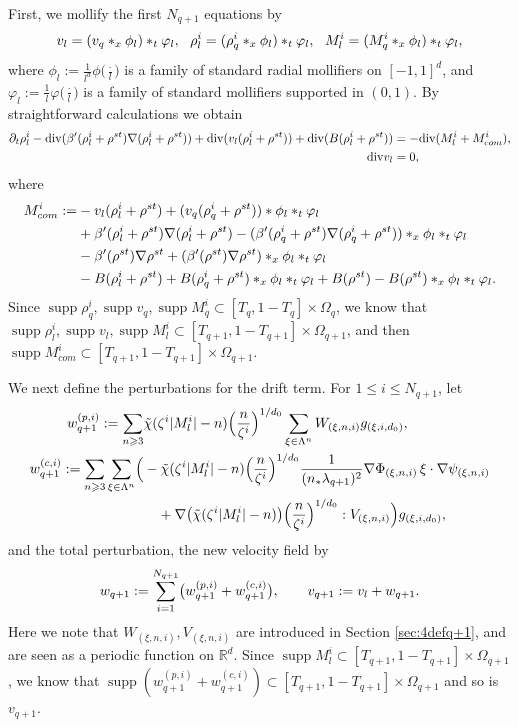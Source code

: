 \documentclass[UTF-8,reqno]{amsart}
\numberwithin{equation}{section}
\theoremstyle{definition}
\DeclareMathOperator{\supp}{supp}
\def\geq{\geqslant}
\def\leq{\leqslant}
\def\div{\mathord{{\rm div}}}
\def\geq{\geqslant}
\def\leq{\leqslant}
\def\div{\mathord{{\rm div}}}
\begin{document}
First,  we mollify the first $N_{q+1}$ equations by\begin{align}
v_l=(v_{q }*_x\phi_l)*_t\varphi_l,\ \ 
 \rho_l^i=(\rho_{q}^i*_x\phi_l)*_t\varphi_l,\ \ M_l^i=(M_{q }^i*_x\phi_l)*_t\varphi_l,\notag
\end{align}
where 
$
\phi_l:=\frac1{l^d}\phi\bigl(\tfrac{\cdot}{l}\bigr)
$
is a family of standard radial mollifiers on $[-1,1]^d$, and  
$
\varphi_l:=\frac1l\varphi\bigl(\tfrac{\cdot}{l}\bigr)
$
is a family of standard mollifiers supported in $(0,1)$. By straightforward calculations  we obtain 
\begin{align}
\partial_t \rho_l^i-\div(\beta'(\rho_l^i+\rho^{st})\nabla(\rho_l^i+\rho^{st}))+\div(v_l (\rho_l^i+\rho^{st}))+\div(B(\rho_l^i+\rho^{st}))&=-\div (M^i_l+M^i_{com}),\notag\\ \div v_l&=0,\notag
\end{align} where
\begin{align*}
M^i_{com} :=&-v_l   (\rho^i_l+\rho^{st})+(v_{q}   (\rho^i_{q}+\rho^{st}))* \phi_l*_t\varphi_l\\
&+\beta'(\rho^i _l+\rho^{st}) \nabla(\rho^i _l+\rho^{st})-(\beta'(\rho^i _q+\rho^{st}) \nabla(\rho^i _q+\rho^{st}))*_x\phi_l*_t\varphi_l\\
&-\beta'(\rho^{st}) \nabla\rho^{st}+(\beta'(\rho^{st}) \nabla\rho^{st})*_x\phi_l*_t\varphi_l\\
 &  -B(\rho_l^i+\rho^{st})+B(\rho_q^i+\rho^{st})*_x\phi_l*_t\varphi_l +B(\rho^{st})-B(\rho^{st})*_x\phi_l*_t\varphi_l.\notag
\end{align*} 
  Since $  \supp\rho_q^i,\supp v_q,\supp M_q^i\subset[T_q,1-T_q]\times \Omega_q $, we know that $  \supp\rho_l^i,\supp v_l,\supp M_l^i\subset [T_{q+1},1-T_{q+1}]\times \Omega_{q+1} $, and then $\supp M_{com}^i\subset [T_{q+1},1-T_{q+1}]\times\Omega_{q+1} $.
 


We next define the perturbations for the drift term. 
For $1\leq i\leq N_{q+1}$, let
\begin{align*}
w_{q+1}^{(p,i)}
:=
\sum_{n\geq3}
&\tilde{\chi}(\zeta^i|M_l^i|-n)
\Bigl(\frac{n}{\zeta^i}\Bigr)^{1/d_0}
\sum_{\xi\in\Lambda^n}
W_{(\xi,n,i)}g_{(\xi,i,d_0)},\\
w_{q+1}^{(c,i)}
:=
\sum_{n\geq3}
\sum_{\xi\in\Lambda^n}
\Bigl(
&
-\tilde{\chi}(\zeta^i|M_l^i|-n)
\Bigl(\frac{n}{\zeta^i}\Bigr)^{1/d_0}
\frac1{(n_*\lambda_{q+1})^2}
\nabla\Phi_{(\xi,n,i)}
\,\xi\cdot\nabla\psi_{(\xi,n,i)}
\\
&\quad
+
\nabla\bigl(
\tilde{\chi}(\zeta^i|M_l^i|-n)
\bigr)
\Bigl(\frac{n}{\zeta^i}\Bigr)^{1/d_0}
:V_{(\xi,n,i)}
\Bigr)
g_{(\xi,i,d_0)},
\end{align*}
and the total perturbation, the new velocity field by
\begin{align}
w_{q+1}
:=
\sum_{i=1}^{N_{q+1}}
\bigl(
w_{q+1}^{(p,i)}
+
w_{q+1}^{(c,i)}
\bigr),
\qquad
v_{q+1}
:=
v_l+w_{q+1}.
\notag
\end{align}
Here we note that $W_{ (\xi,n,i)},V_{ (\xi,n,i)}$ are introduced in Section \ref{sec:4defq+1}, and are seen as a periodic function on $\mathbb{R}^d$.
Since $\supp M_l^i\subset[T_{q+1},1-T_{q+1}]\times\Omega_{q+1}$, we know that $\supp (w_{q+1}^{(p,i)}+w_{q+1}^{(c,i)})\subset[T_{q+1},1-T_{q+1}]\times\Omega_{q+1}$ and so is $v_{q+1}$.  
 
\end{document}
